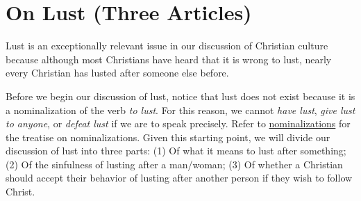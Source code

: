 \documentclass[a4paper, parskip=full, 12pt]{article}
\begin{document}
\section{On Lust (Three Articles)}
Lust is an exceptionally relevant issue in our discussion of Christian culture because although most Christians have heard that it is wrong to lust, nearly every Christian has lusted after someone else before.



Before we begin our discussion of lust, notice that lust does not exist because it is a nominalization of the verb \textit{to lust}. For this reason, we cannot \textit{have lust}, \textit{give lust to anyone}, or \textit{defeat lust} if we are to speak precisely. Refer to \underline{nominalizations} for the treatise on nominalizations. Given this starting point, we will divide our discussion of lust into three parts: (1) Of what it means to lust after something; (2) Of the sinfulness of lusting after a man/woman; (3) Of whether a Christian should accept their behavior of lusting after another person if they wish to follow Christ. \\
\end{document}
